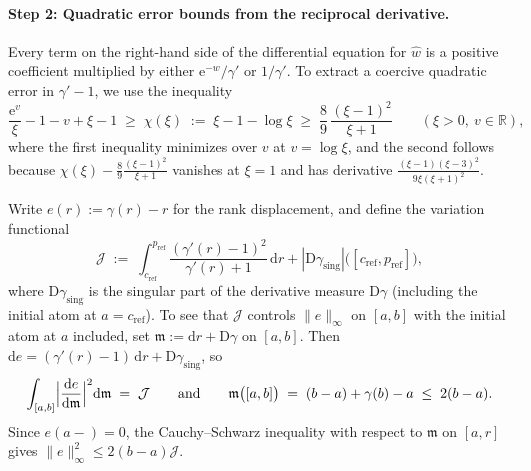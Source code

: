 \documentclass[11pt]{article}
\numberwithin{equation}{section}
\theoremstyle{plain}
\theoremstyle{definition}
\newcommand{\R}{\mathbb{R}}
\newcommand{\1}{\mathbf{1}}
\newcommand{\calJ}{\mathcal{J}}
\begin{document}
\paragraph{Step 2: Quadratic error bounds from the reciprocal derivative.}
Every term on the right-hand side of the differential equation for $\widehat{w}$ is a positive coefficient multiplied by either $\mathrm{e}^{-w}/\gamma'$ or $1/\gamma'$. To extract a coercive quadratic error in $\gamma' - 1$, we use the inequality
\begin{equation}
  \frac{\mathrm{e}^v}{\xi} - 1 - v + \xi - 1 \;\ge\; \chi(\xi) \;:=\; \xi - 1 - \log\xi \;\ge\; \frac{8}{9}\,\frac{(\xi - 1)^2}{\xi + 1}
  \qquad (\xi > 0,\ v \in \R),
  \label{eq:chi-inequality}
\end{equation}
where the first inequality minimizes over $v$ at $v = \log\xi$, and the second follows because $\chi(\xi) - \frac{8}{9}\frac{(\xi - 1)^2}{\xi + 1}$ vanishes at $\xi = 1$ and has derivative $\frac{(\xi - 1)(\xi - 3)^2}{9\xi(\xi + 1)^2}$.

Write $e(r) := \gamma(r) - r$ for the rank displacement, and define the variation functional
\[
  \calJ \;:=\; \int_{c_{\mathrm{ref}}}^{p_{\mathrm{ref}}} \frac{(\gamma'(r) - 1)^2}{\gamma'(r) + 1}\,\mathrm{d}r + |\mathrm{D}\gamma_{\mathrm{sing}}|\bigl([c_{\mathrm{ref}}, p_{\mathrm{ref}}]\bigr),
\]
where $\mathrm{D}\gamma_{\mathrm{sing}}$ is the singular part of the derivative measure $\mathrm{D}\gamma$ (including the initial atom at $a = c_{\mathrm{ref}}$). To see that $\calJ$ controls $\|e\|_\infty$ on $[a, b]$ with the initial atom at $a$ included, set $\mathfrak{m} := \mathrm{d}r + \mathrm{D}\gamma$ on $[a, b]$. Then $\mathrm{d}e = (\gamma'(r) - 1)\,\mathrm{d}r + \mathrm{D}\gamma_{\mathrm{sing}}$, so
\[
  \int_{[a, b]} \Bigl|\frac{\mathrm{d}e}{\mathrm{d}\mathfrak{m}}\Bigr|^2 \mathrm{d}\mathfrak{m} \;=\; \calJ
  \qquad\text{and}\qquad
  \mathfrak{m}\bigl([a, b]\bigr) \;=\; (b - a) + \gamma(b) - a \;\le\; 2(b - a).
\]
Since $e(a-) = 0$, the Cauchy--Schwarz inequality with respect to $\mathfrak{m}$ on $[a, r]$ gives $\|e\|_\infty^2 \le 2(b - a)\calJ$.
\end{document}
